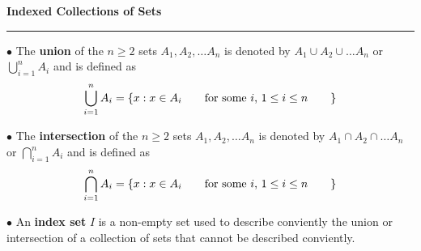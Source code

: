 {\bf Indexed Collections of Sets}
\hrule
\vskip 6pt

$\bullet$ The {\bf union} of the $n\geq 2$ sets $A_1,A_2,\ldots A_n$ is denoted by $A_1\cup A_2 \cup \ldots A_n$ or $\bigcup_{i=1}^nA_i$ and is defined as $$\bigcup_{i=1}^nA_i=\lbrace x: x\in A_i \qquad\hbox{for some $i$, $1\leq i \leq n$}\qquad\rbrace$$

$\bullet$ The {\bf intersection} of the $n\geq 2$ sets $A_1,A_2,\ldots A_n$ is denoted by $A_1\cap A_2 \cap \ldots A_n$ or $\bigcap_{i=1}^nA_i$ and is defined as $$\bigcap_{i=1}^nA_i=\lbrace x: x\in A_i \qquad\hbox{for some $i$, $1\leq i \leq n$}\qquad\rbrace$$

$\bullet$ An {\bf index set} $I$ is a non-empty set used to describe conviently the union or intersection of a collection of sets that cannot be described conviently.

\vfill\eject
